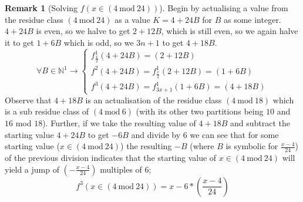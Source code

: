 \documentclass[12pt,a4paper]{amsart}
\numberwithin{equation}{section}
\theoremstyle{plain}
\theoremstyle{definition}
\newtheorem{Rem}[Th]{Remark}
\begin{document}
\begin{Rem}[Solving $f \left ( x \in \left ( 4\:\mathrm{mod}\:24 \right ) \right )$]
Begin by actualising a value from the residue class $\left ( 4\:\mathrm{mod}\:24 \right )$ as a value $K = 4 + 24B$ for $B$ as some integer. $4 + 24B$ is even, so we halve to get $2 + 12B$, which is still even, so we again halve it to get $1+6B$ which is odd, so we $3n+1$ to get $4+18B$.
\begin{equation}
\forall B \in \mathbb{N}^{1} \rightarrow \left \{  \begin{matrix}
f^{1}_{\frac{x}{2}} \left ( 4+24B \right ) = \left ( 2+12B \right ) \\ 
f^{2} \left ( 4+24B \right ) = f^{1}_{\frac{x}{2}} \left ( 2+12B \right ) =  \left ( 1+6B \right ) \\
f^{3} \left ( 4+24B \right ) = f^{1}_{3x+1} \left ( 1+6B \right ) =  \left ( 4+18B \right ) 
\end{matrix} \right.
\end{equation}
Observe that $4+18B$ is an actualisation of the residue class  $\left ( 4\:\mathrm{mod}\:18 \right )$ which is a sub residue class of  $\left ( 4\:\mathrm{mod}\:6 \right )$ (with its other two partitions being $10$ and $16$ mod $18$). Further, if we take the resulting value of $4+18B$ and subtract the starting value $4+24B$ to get $-6B$ and divide by $6$ we can see that for some starting value ($x \in \left ( 4\:\mathrm{mod}\:24 \right )$) the resulting $-B$ (where $B$ is symbolic for $\frac{x-4}{24}$) of the previous division indicates that the starting value of $x \in \left ( 4\:\mathrm{mod}\:24 \right )$ will yield a jump of $\left ( -\frac{x-4}{24} \right )$ multiples of $6$;
\begin{equation}
f^{3} \left ( x \in \left ( 4\:\mathrm{mod}\:24 \right ) \right ) = x-6*\left ( \frac{x-4}{24} \right )
\end{equation}
\end{Rem}
\end{document}
